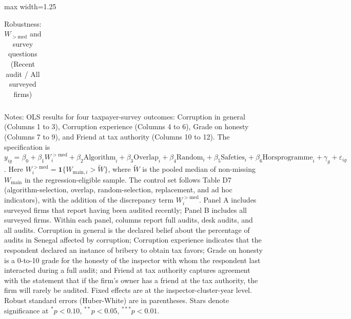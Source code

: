 \documentclass{article}
\newcommand{\OutPath}{Output/}%
\newcommand{\OutPath}{../Output/}%
\begin{document}
\begin{landscape}
\begin{table}[!htbp]
\centering
\begin{adjustbox}{max width=1.25\textwidth}
\begin{threeparttable}
\caption{Robustness: \(W_{>\mathrm{med}}\) and survey questions (Recent audit / All surveyed firms)}
\begin{tabular}{l*{12}{c}}

\end{tabular}
\begin{tablenotes}[flushleft]
\footnotesize
\item Notes: OLS results for four taxpayer-survey outcomes: Corruption in general (Columns 1 to 3), Corruption experience (Columns 4 to 6), Grade on honesty (Columns 7 to 9), and Friend at tax authority (Columns 10 to 12). The specification is \(y_{ig}=\beta_0+\beta_1 W_i^{>\mathrm{med}}+\beta_2 \text{Algorithm}_i+\beta_3 \text{Overlap}_i+\beta_4 \text{Random}_i+\beta_5 \text{Safeties}_i+\beta_6 \text{Horsprogramme}_i+\gamma_g+\varepsilon_{ig}\). Here \(W_i^{>\mathrm{med}}=\mathbf{1}\{W_{\text{main},i}>\widetilde{W}\}\), where \(\widetilde{W}\) is the pooled median of non-missing \(W_{\text{main}}\) in the regression-eligible sample. The control set follows Table D7 (algorithm-selection, overlap, random-selection, replacement, and ad hoc indicators), with the addition of the discrepancy term \(W_i^{>\mathrm{med}}\). Panel A includes surveyed firms that report having been audited recently; Panel B includes all surveyed firms. Within each panel, columns report full audits, desk audits, and all audits. Corruption in general is the declared belief about the percentage of audits in Senegal affected by corruption; Corruption experience indicates that the respondent declared an instance of bribery to obtain tax favors; Grade on honesty is a 0-to-10 grade for the honesty of the inspector with whom the respondent last interacted during a full audit; and Friend at tax authority captures agreement with the statement that if the firm's owner has a friend at the tax authority, the firm will rarely be audited. Fixed effects are at the inspector-cluster-year level. Robust standard errors (Huber-White) are in parentheses. Stars denote significance at \(^{*}p<0.10\), \(^{**}p<0.05\), \(^{***}p<0.01\).
\end{tablenotes}
\end{threeparttable}
\end{adjustbox}
\end{table}
\end{landscape}
\end{document}
